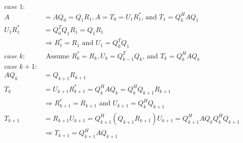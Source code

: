\documentclass{article}
\begin{document}
\begin{align*}
    case \; 1:&\\
    A &= AQ_0 = Q_1R_1, A = T_0 =U_1R_1^* \textrm{, and } T_1 = Q_k^HAQ_1\\
    U_1R_1^* &= Q_0^TQ_1R_1 = Q_1R_1\\
    &\Rightarrow R_1^* = R_1 \textrm{ and } U_1 = Q_0^TQ_1\\
    case \; k:& \textrm{ Assume } R_k^* = R_k, U_k = Q_{k-1}^TQ_k \textrm{, and } T_k = Q_k^HAQ_k\\
    case \; k+1:&\\
    AQ_k &= Q_{k+1}R_{k+1}\\
    T_k &=U_{k+1}R_{k+1}^* = Q_k^HAQ_k = Q_k^HQ_{k+1}R_{k+1}\\
    &\Rightarrow R_{k+1}^* = R_{k+1} \text{ and } U_{k+1} = Q_k^HQ_{k+1}\\
    T_{k+1} &= R_{k+1}U_{k+1} = Q_{k+1}^H(Q_{k+1}R_{k+1})U_{k+1} = Q_{k+1}^HAQ_kQ_k^HQ_{k+1}\\
    &\Rightarrow T_{k+1} = Q_{k+1}^HAQ_{k+1}
\end{align*}
\end{document}
